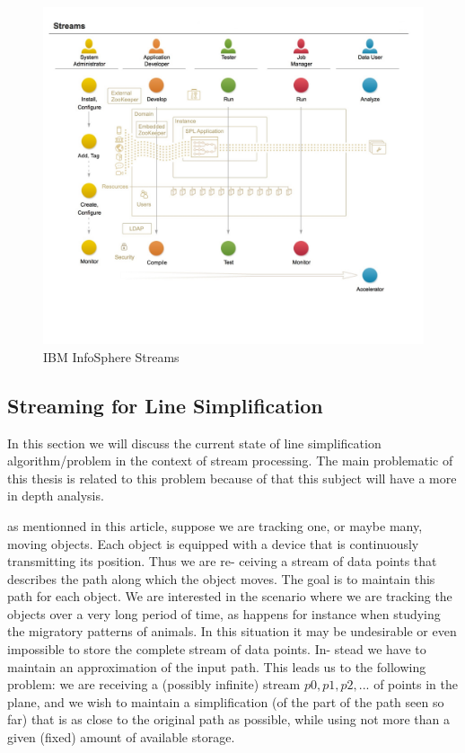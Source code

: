 \documentclass[twoside,12pt, a4paper]{report}
\begin{document}
\begin{figure}[!h]
	\centering
	\includegraphics[width=1\linewidth]{figures/model.jpg}
	\caption{\cite{ibmdoc} IBM InfoSphere Streams}
	\label{fig:ibm}
\end{figure}


\subsection{Streaming for Line Simplification}
In this section we will discuss the current state of line simplification algorithm/problem in the context of stream processing.
The main problematic of this thesis is related to this problem because of that this subject will have a more in depth analysis.

\cite{abam2007streaming} as mentionned in this article, suppose we are tracking one, or maybe many,
moving objects. Each object is equipped with a device that
is continuously transmitting its position. Thus we are re-
ceiving a stream of data points that describes the path along
which the object moves. The goal is to maintain this path
for each object. We are interested in the scenario where we
are tracking the objects over a very long period of time, as
happens for instance when studying the migratory patterns
of animals. In this situation it may be undesirable or even
impossible to store the complete stream of data points. In-
stead we have to maintain an approximation of the input
path. This leads us to the following problem: we are receiving a (possibly infinite) stream $p0,p1,p2,...$ of points in
the plane, and we wish to maintain a simplification (of the
part of the path seen so far) that is as close to the original
path as possible, while using not more than a given (fixed)
amount of available storage.
\end{document}
